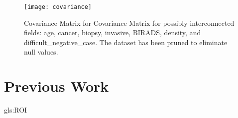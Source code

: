 \documentclass[]{article}
\begin{document}
\begin{figure}[H]
	\begin{center}
		\caption[Covariance Matrix for possibly interconnected fields]{Covariance Matrix for Covariance Matrix for possibly interconnected fields: age, cancer, biopsy, invasive, BIRADS, density, and difficult\_negative\_case. The dataset has been pruned to eliminate null values.}\label{fig:covariance}
		\texttt{[image: covariance]}
	\end{center}
\end{figure}

\section{Previous Work}
\gls{gls:ROI}
\cite{shen2019deep}

\printglossaries




\end{document}
